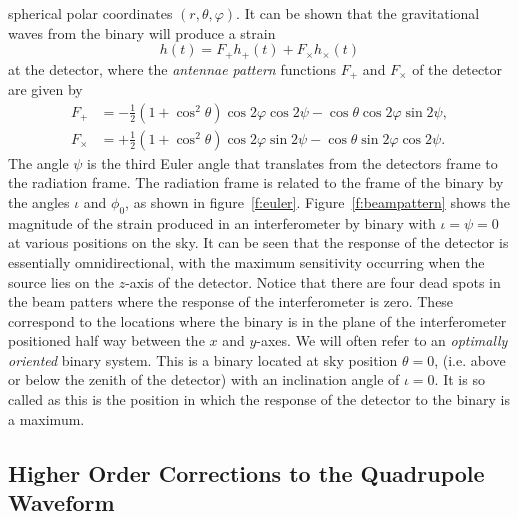 spherical polar coordinates $(r,\theta,\varphi)$. It can be shown that the
gravitational waves from the binary will produce a
strain\cite{1987MNRAS.224..131S}
\begin{equation}
h(t) = F_+ h_+(t) + F_\times h_\times(t)
\end{equation}
at the detector, where the \emph{antennae pattern} functions $F_+$ and
$F_\times$ of the detector are given by
\begin{align}
F_+ &= -\frac{1}{2}(1 + \cos^2\theta) \cos 2\varphi \cos 2 \psi - 
\cos\theta \cos 2\varphi \sin 2\psi, \\
F_\times &= +\frac{1}{2}( 1 + \cos^2 \theta) \cos 2\varphi \sin 2\psi -
\cos\theta \sin 2\varphi \cos 2 \psi.
\label{eq:ftimesfunc}
\end{align}
The angle $\psi$ is the third Euler angle that translates from the detectors
frame to the radiation frame. The radiation frame is related to the frame of
the binary by the angles $\iota$ and $\phi_0$, as shown in
figure~\ref{f:euler}. Figure~\ref{f:beampattern} shows the magnitude of the 
strain produced in an interferometer by binary with $\iota = \psi = 0$ at
various positions on the sky. It can be seen that the response of the
detector is essentially omnidirectional, with the maximum sensitivity
occurring when the source lies on the $z$-axis of the detector. Notice that
there are four dead spots in the beam patters where the response of the
interferometer is zero. These correspond to the locations where the binary is
in the plane of the interferometer positioned half way between the $x$ and
$y$-axes. We will often refer to an \emph{optimally oriented} binary system.
This is a binary located at sky position $\theta = 0$, (i.e. above or below
the zenith of the detector) with an inclination angle of $\iota = 0$. It is so
called as this is the position in which the response of the detector to the
binary is a maximum.

\subsection{Higher Order Corrections to the Quadrupole Waveform}

